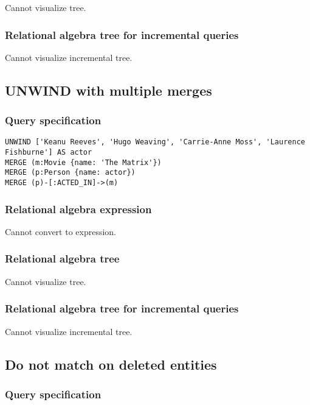 Cannot visualize tree.

\subsubsection*{Relational algebra tree for incremental queries}

Cannot visualize incremental tree.

\subsection{UNWIND with multiple merges}

\subsubsection*{Query specification}

\begin{lstlisting}
UNWIND ['Keanu Reeves', 'Hugo Weaving', 'Carrie-Anne Moss', 'Laurence Fishburne'] AS actor
MERGE (m:Movie {name: 'The Matrix'})
MERGE (p:Person {name: actor})
MERGE (p)-[:ACTED_IN]->(m)
\end{lstlisting}

\subsubsection*{Relational algebra expression}

Cannot convert to expression.

\subsubsection*{Relational algebra tree}

Cannot visualize tree.

\subsubsection*{Relational algebra tree for incremental queries}

Cannot visualize incremental tree.

\subsection{Do not match on deleted entities}

\subsubsection*{Query specification}

